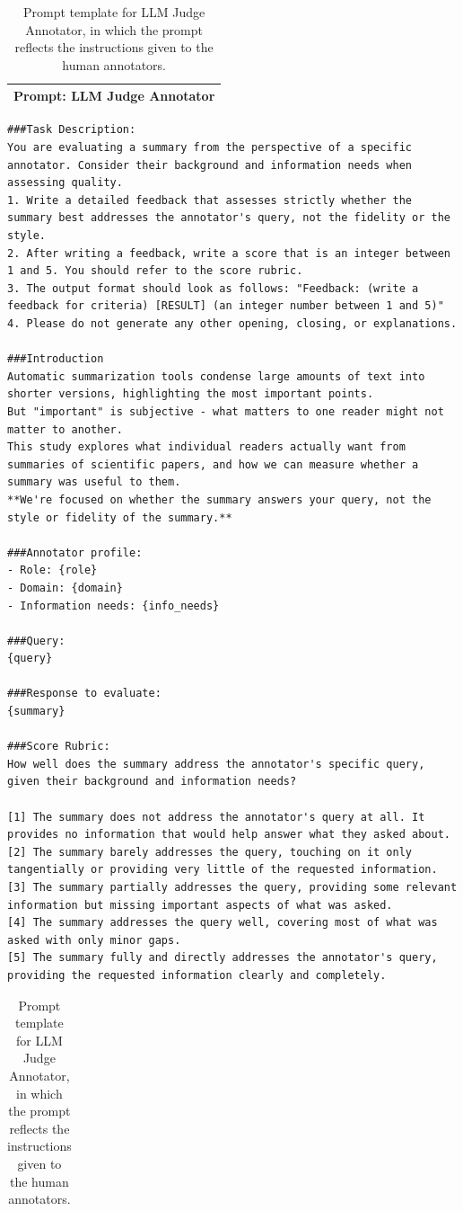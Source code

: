 
\begin{table}[h]
\centering
\footnotesize
\begin{tabular}{p{}}
\toprule
\textbf{Prompt: LLM Judge Annotator} \\
\midrule
\end{tabular}
\begin{lstlisting}[style=promptstyle]
###Task Description:
You are evaluating a summary from the perspective of a specific annotator. Consider their background and information needs when assessing quality.
1. Write a detailed feedback that assesses strictly whether the summary best addresses the annotator's query, not the fidelity or the style.
2. After writing a feedback, write a score that is an integer between 1 and 5. You should refer to the score rubric.
3. The output format should look as follows: "Feedback: (write a feedback for criteria) [RESULT] (an integer number between 1 and 5)"
4. Please do not generate any other opening, closing, or explanations.

###Introduction
Automatic summarization tools condense large amounts of text into shorter versions, highlighting the most important points.
But "important" is subjective - what matters to one reader might not matter to another.
This study explores what individual readers actually want from summaries of scientific papers, and how we can measure whether a summary was useful to them.
**We're focused on whether the summary answers your query, not the style or fidelity of the summary.**

###Annotator profile:
- Role: {role}
- Domain: {domain}
- Information needs: {info_needs}

###Query:
{query}

###Response to evaluate:
{summary}

###Score Rubric:
How well does the summary address the annotator's specific query, given their background and information needs?
        
[1] The summary does not address the annotator's query at all. It provides no information that would help answer what they asked about.
[2] The summary barely addresses the query, touching on it only tangentially or providing very little of the requested information.
[3] The summary partially addresses the query, providing some relevant information but missing important aspects of what was asked.
[4] The summary addresses the query well, covering most of what was asked with only minor gaps.
[5] The summary fully and directly addresses the annotator's query, providing the requested information clearly and completely.
\end{lstlisting}
\begin{tabular}{p{\textwidth}}
\bottomrule
\end{tabular}
\caption[Prompt template for LLM Judge Annotator.]{Prompt template for LLM Judge Annotator, in which the prompt reflects the instructions given to the human annotators.}\label{tab:ch-7-prompt-llm-judge-annotator}
\end{table}

